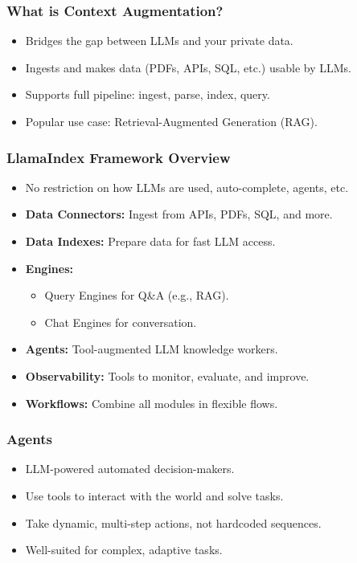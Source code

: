 \begin{frame}[fragile]\frametitle{What is Context Augmentation?}
\begin{itemize}
  \item Bridges the gap between LLMs and your private data.
  \item Ingests and makes data (PDFs, APIs, SQL, etc.) usable by LLMs.
  \item Supports full pipeline: ingest, parse, index, query.
  \item Popular use case: Retrieval-Augmented Generation (RAG).
\end{itemize}
\end{frame}



\begin{frame}[fragile]\frametitle{LlamaIndex Framework Overview}
\begin{itemize}
  \item No restriction on how LLMs are used, auto-complete, agents, etc.
  \item \textbf{Data Connectors:} Ingest from APIs, PDFs, SQL, and more.
  \item \textbf{Data Indexes:} Prepare data for fast LLM access.
  \item \textbf{Engines:} 
    \begin{itemize}
        \item Query Engines for Q\&A (e.g., RAG).
        \item Chat Engines for conversation.
    \end{itemize}
  \item \textbf{Agents:} Tool-augmented LLM knowledge workers.
  \item \textbf{Observability:} Tools to monitor, evaluate, and improve.
  \item \textbf{Workflows:} Combine all modules in flexible flows.
\end{itemize}
\end{frame}

\begin{frame}[fragile]\frametitle{Agents}
\begin{itemize}
  \item LLM-powered automated decision-makers.
  \item Use tools to interact with the world and solve tasks.
  \item Take dynamic, multi-step actions, not hardcoded sequences.
  \item Well-suited for complex, adaptive tasks.
\end{itemize}
\end{frame}

